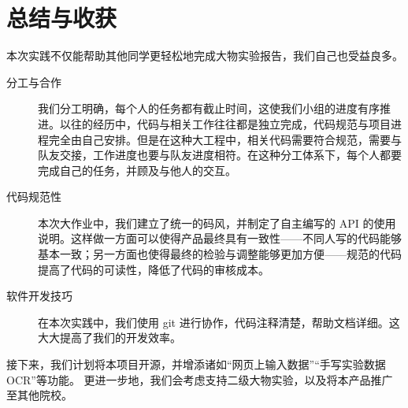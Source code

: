 \section{总结与收获}

本次实践不仅能帮助其他同学更轻松地完成大物实验报告，我们自己也受益良多。

\begin{description}
  \item[分工与合作] 我们分工明确，每个人的任务都有截止时间，这使我们小组的进度有序推进。以往的经历中，代码与相关工作往往都是独立完成，代码规范与项目进程完全由自己安排。但是在这种大工程中，相关代码需要符合规范，需要与队友交接，工作进度也要与队友进度相符。在这种分工体系下，每个人都要完成自己的任务，并顾及与他人的交互。
  \item[代码规范性] 本次大作业中，我们建立了统一的码风，并制定了自主编写的 API 的使用说明。这样做一方面可以使得产品最终具有一致性——不同人写的代码能够基本一致；另一方面也使得最终的检验与调整能够更加方便——规范的代码提高了代码的可读性，降低了代码的审核成本。
  \item[软件开发技巧] 在本次实践中，我们使用 git 进行协作，代码注释清楚，帮助文档详细。这大大提高了我们的开发效率。
\end{description}

接下来，我们计划将本项目开源，并增添诸如“网页上输入数据”“手写实验数据 OCR”等功能。
更进一步地，我们会考虑支持二级大物实验，以及将本产品推广至其他院校。
